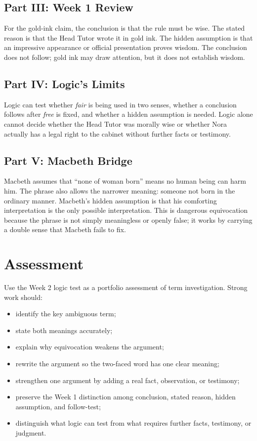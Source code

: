 \documentclass[12pt]{article}
\begin{document}
\subsection*{Part III: Week 1 Review}
For the gold-ink claim, the conclusion is that the rule must be wise. The stated reason is that the Head Tutor wrote it in gold ink. The hidden assumption is that an impressive appearance or official presentation proves wisdom. The conclusion does not follow; gold ink may draw attention, but it does not establish wisdom.

\subsection*{Part IV: Logic's Limits}
Logic can test whether \textit{fair} is being used in two senses, whether a conclusion follows after \textit{free} is fixed, and whether a hidden assumption is needed. Logic alone cannot decide whether the Head Tutor was morally wise or whether Nora actually has a legal right to the cabinet without further facts or testimony.

\subsection*{Part V: Macbeth Bridge}
Macbeth assumes that ``none of woman born'' means no human being can harm him. The phrase also allows the narrower meaning: someone not born in the ordinary manner. Macbeth's hidden assumption is that his comforting interpretation is the only possible interpretation. This is dangerous equivocation because the phrase is not simply meaningless or openly false; it works by carrying a double sense that Macbeth fails to fix.

\section*{Assessment}
Use the Week 2 logic test as a portfolio assessment of term investigation. Strong work should:
\begin{itemize}[leftmargin=*]
\item identify the key ambiguous term;
\item state both meanings accurately;
\item explain why equivocation weakens the argument;
\item rewrite the argument so the two-faced word has one clear meaning;
\item strengthen one argument by adding a real fact, observation, or testimony;
\item preserve the Week 1 distinction among conclusion, stated reason, hidden assumption, and follow-test;
\item distinguish what logic can test from what requires further facts, testimony, or judgment.
\end{itemize}
\end{document}
